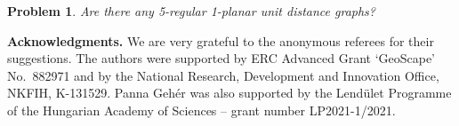 \documentclass[a4paper,10pt]{article}
\newtheorem{problem}{Problem}
\begin{document}
\begin{problem}
Are there any 5-regular 1-planar unit distance graphs?
\end{problem}





\vspace{5mm}

\noindent
{\bf \large Acknowledgments.}
We are very grateful to the anonymous referees for their suggestions. The authors were supported by ERC Advanced Grant `GeoScape' No.\ 882971 and by the National Research, Development and Innovation Office, NKFIH, K-131529. Panna Geh\'er was also supported by the Lend\"ulet Programme of the Hungarian Academy of Sciences -- grant number LP2021-1/2021. 
 
\end{document}
